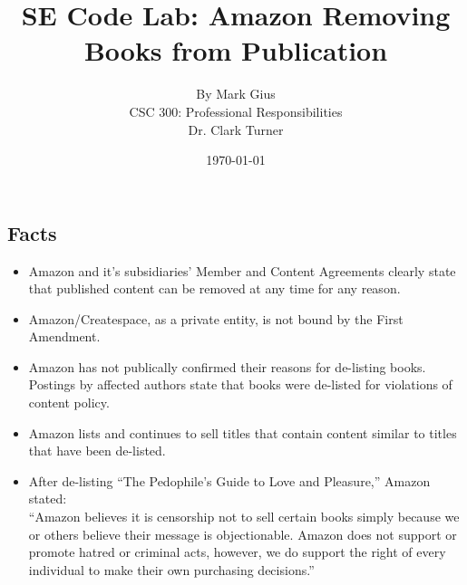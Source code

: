 \documentclass[10pt]{article}
\begin{document}
\title{\vfill SE Code Lab: Amazon Removing Books from Publication} %
\author{
By Mark Gius \vspace{10pt} \\ 
CSC 300: Professional Responsibilities  \vspace{10pt} \\ 
Dr. Clark Turner \vspace{10pt} \\ 
}
\date{\today}

\maketitle

\begin{multicols}{2}

\section{Facts}
\begin{itemize}
\item Amazon and it's subsidiaries' Member and Content Agreements clearly state that published content can be removed at any time for any reason. \cite{createspaceMemberAgreement} \cite{createspaceContentGuidelines} \cite{AmazonDTPContentGuidelines}

\item Amazon/Createspace, as a private entity, is not bound by the First Amendment.

\item Amazon has not publically confirmed their reasons for de-listing books. Postings by affected authors state that books were de-listed for violations of content policy. \cite{KittSelfPubRevolution} 

\item Amazon lists and continues to sell titles that contain content similar to titles that have been de-listed. \cite{AmazonLolitaDTPListing}

\item After de-listing ``The Pedophile's Guide to Love and Pleasure,'' Amazon stated: \\
      ``Amazon believes it is censorship not to sell certain books simply because we or others believe their message is objectionable.  Amazon does not support or promote hatred or criminal acts, however, we do support the right of every individual to make their own purchasing decisions.'' \cite{TechCrunchAmazonCensorship}


\end{itemize}
\end{multicols}
\end{document}
